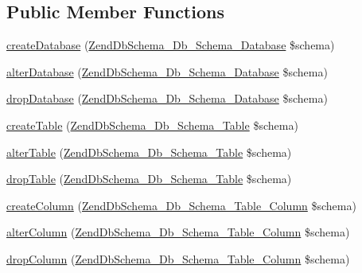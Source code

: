 \subsection*{\-Public \-Member \-Functions}
\begin{DoxyCompactItemize}
\item 
\hyperlink{classZendDbSchema__Db__Schema__Generator__Mysql_a823d987af06bbcaa2142f2da3c6fd3c2}{create\-Database} (\hyperlink{classZendDbSchema__Db__Schema__Database}{\-Zend\-Db\-Schema\-\_\-\-Db\-\_\-\-Schema\-\_\-\-Database} \$schema)
\item 
\hyperlink{classZendDbSchema__Db__Schema__Generator__Mysql_a5ffe10ce956b3e189c364d2bd03acf88}{alter\-Database} (\hyperlink{classZendDbSchema__Db__Schema__Database}{\-Zend\-Db\-Schema\-\_\-\-Db\-\_\-\-Schema\-\_\-\-Database} \$schema)
\item 
\hyperlink{classZendDbSchema__Db__Schema__Generator__Mysql_ab3c87af9fdc6ba8d911b1162a67dc0be}{drop\-Database} (\hyperlink{classZendDbSchema__Db__Schema__Database}{\-Zend\-Db\-Schema\-\_\-\-Db\-\_\-\-Schema\-\_\-\-Database} \$schema)
\item 
\hyperlink{classZendDbSchema__Db__Schema__Generator__Mysql_add2a0dcdb35c6ef230b09ad31d141b29}{create\-Table} (\hyperlink{classZendDbSchema__Db__Schema__Table}{\-Zend\-Db\-Schema\-\_\-\-Db\-\_\-\-Schema\-\_\-\-Table} \$schema)
\item 
\hyperlink{classZendDbSchema__Db__Schema__Generator__Mysql_aebe278ab07f38d58f8f440f9cad01565}{alter\-Table} (\hyperlink{classZendDbSchema__Db__Schema__Table}{\-Zend\-Db\-Schema\-\_\-\-Db\-\_\-\-Schema\-\_\-\-Table} \$schema)
\item 
\hyperlink{classZendDbSchema__Db__Schema__Generator__Mysql_a963a138b593e5e9e3a6b9a8e540a4a10}{drop\-Table} (\hyperlink{classZendDbSchema__Db__Schema__Table}{\-Zend\-Db\-Schema\-\_\-\-Db\-\_\-\-Schema\-\_\-\-Table} \$schema)
\item 
\hyperlink{classZendDbSchema__Db__Schema__Generator__Mysql_a86040ff7c424a0ad7e5f4aadeec20a4c}{create\-Column} (\hyperlink{classZendDbSchema__Db__Schema__Table__Column}{\-Zend\-Db\-Schema\-\_\-\-Db\-\_\-\-Schema\-\_\-\-Table\-\_\-\-Column} \$schema)
\item 
\hyperlink{classZendDbSchema__Db__Schema__Generator__Mysql_a57a5e637e2c19faee40597d96d6b71b3}{alter\-Column} (\hyperlink{classZendDbSchema__Db__Schema__Table__Column}{\-Zend\-Db\-Schema\-\_\-\-Db\-\_\-\-Schema\-\_\-\-Table\-\_\-\-Column} \$schema)
\item 
\hyperlink{classZendDbSchema__Db__Schema__Generator__Mysql_a6fef0a3176c0e99d533b1790c7ae0301}{drop\-Column} (\hyperlink{classZendDbSchema__Db__Schema__Table__Column}{\-Zend\-Db\-Schema\-\_\-\-Db\-\_\-\-Schema\-\_\-\-Table\-\_\-\-Column} \$schema)

\end{DoxyCompactItemize}

